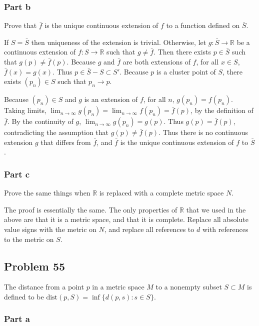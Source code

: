 \documentclass{article}
\newcommand{\R}{\mathbb{R}}
\newcommand{\dist}{\text{dist}}
\begin{document}
\subsubsection*{Part b}

Prove that $\bar{f}$ is the unique continuous extension of $f$ to a function defined on $\bar{S}$.

If $S = \bar{S}$ then uniqueness of the extension is trivial. Otherwise, let $g: \bar{S} \rightarrow \R$ be a continuous extension of $f: S \rightarrow \R$ such that $g \neq \bar{f}$. Then there exists $p \in \bar{S}$ such that $g(p) \neq \bar{f}(p)$. Because $g$ and $\bar{f}$ are both extensions of $f$, for all $x \in S$, $\bar{f}(x) = g(x)$. Thus $p \in \bar{S} - S \subset S'$. Because $p$ is a cluster point of $S$, there exists $(p_n) \in S$ such that $p_n \rightarrow p$.

Because $(p_n) \in S$ and $g$ is an extension of $f$, for all $n$, $g(p_n) = f(p_n)$. Taking limits, $\lim_{n \rightarrow \infty} g(p_n) = \lim_{n \rightarrow \infty} f(p_n) = \bar{f}(p)$, by the definition of $\bar{f}$. By the continuity of $g$, $\lim_{n \rightarrow \infty} g(p_n) = g(p)$. Thus $g(p) = \bar{f}(p)$, contradicting the assumption that $g(p) \neq \bar{f}(p)$. Thus there is no continuous extension $g$ that differs from $\bar{f}$, and $\bar{f}$ is the unique continuous extension of $f$ to $\bar{S}$.

\subsubsection*{Part c}

Prove the same things when $\R$ is replaced with a complete metric space $N$.

The proof is essentially the same. The only properties of $\R$ that we used in the above are that it is a metric space, and that it is complete. Replace all absolute value signs with the metric on $N$, and replace all references to $d$ with references to the metric on $S$.

\subsection*{Problem 55}

The distance from a point $p$ in a metric space $M$ to a nonempty subset $S \subset M$ is defined to be $\dist(p, S) = \inf\{d(p, s): s \in S \}$.

\subsubsection*{Part a}
\end{document}

